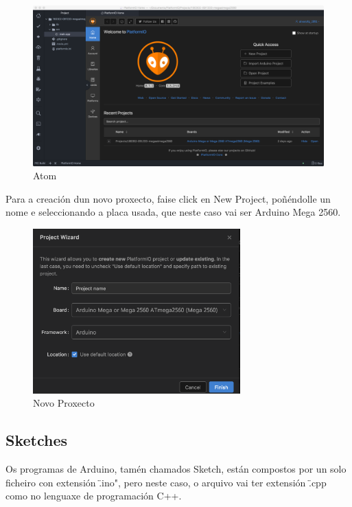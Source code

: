 \documentclass[11pt,twoside]{book}
\begin{document}
\begin{figure}[H]
	\begin{center}
		\includegraphics[width=15cm]{images/Atom.png}
	\end{center}
	\caption{Atom}
	\label{fig:Atom}
\end{figure}

Para a creación dun novo proxecto, faise click en New Project, poñéndolle un nome e seleccionando a placa usada, que neste caso vai ser Arduino Mega 2560.

\begin{figure}[H]
	\begin{center}
		\includegraphics[width=8cm]{images/NewProject.png}
	\end{center}
	\caption{Novo Proxecto}
	\label{fig:NewProject}
\end{figure}

\subsection{Sketches}

Os programas de Arduino, tamén chamados Sketch, están compostos por un solo ficheiro con extensión \"{.ino"}, pero neste caso, o arquivo vai ter extensión \"{.cpp} como no lenguaxe de programación C++.
\end{document}
